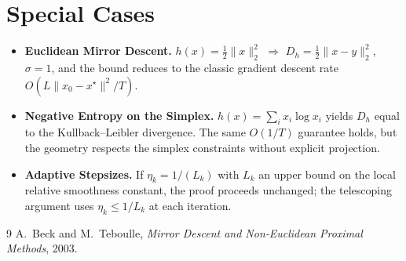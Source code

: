 \documentclass[11pt]{article}
\newcommand{\D}{D}
\begin{document}
\section*{Special Cases}
\begin{itemize}
\item \textbf{Euclidean Mirror Descent.} $h(x)=\tfrac12\|x\|_2^2$ $\Rightarrow$ $\D_h=\tfrac12\|x-y\|_2^2$, $\sigma=1$, and the bound reduces to the classic gradient descent rate $O(L\|x_0-x^{\star}\|^2/T)$.
\item \textbf{Negative Entropy on the Simplex.} $h(x)=\sum_{i}x_i\log x_i$ yields $\D_h$ equal to the Kullback–Leibler divergence. The same $O(1/T)$ guarantee holds, but the geometry respects the simplex constraints without explicit projection.
\item \textbf{Adaptive Stepsizes.} If $\eta_k=1/(L_k)$ with $L_k$ an upper bound on the local relative smoothness constant, the proof proceeds unchanged; the telescoping argument uses $\eta_k\le 1/L_k$ at each iteration.
\end{itemize}

\begin{thebibliography}{9}
A.~Beck and M.~Teboulle, \emph{Mirror Descent and Non‑Euclidean Proximal Methods}, 2003.
\end{thebibliography}
\end{document}

